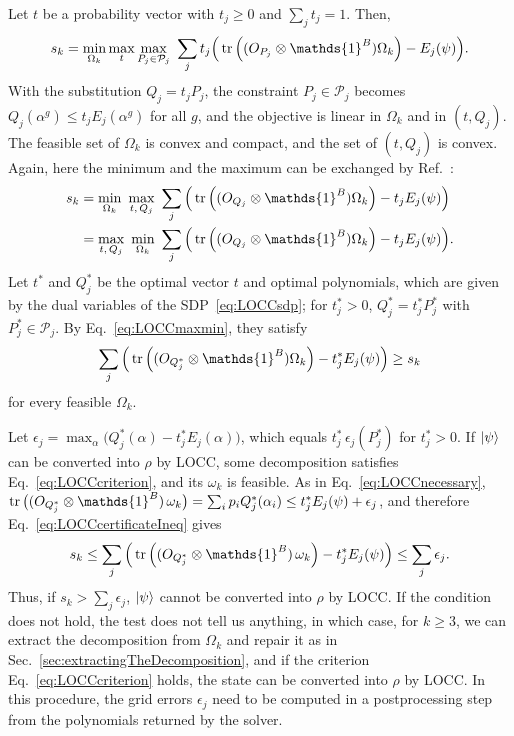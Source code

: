 \documentclass[aps,pra,onecolumn,superscriptaddress]{revtex4-2}
\newcommand{\one}{\mathds{1}}
\newcommand{\I}{\one}
\renewcommand{\a}{\alpha}
\begin{document}
\begin{widetext}
Let $t$ be a probability vector with $t_j \geq 0$ and $\sum_j t_j = 1$. Then,
\begin{align}\label{eq:LOCCminmaxT}
    s_k=\min_{\Omega_k} \max_t \max_{P_j\in\mathcal{P}_j}\ \sum_j t_j\Big(\tr\left((O_{P_j}\otimes\I^B)\Omega_k\right)-E_j(\psi)\Big).
\end{align}
With the substitution $Q_j=t_jP_j$, the constraint $P_j\in\mathcal{P}_j$ becomes $Q_j(\a^g)\leq t_jE_j(\a^g)$ for all $g$, and the objective is linear in $\Omega_k$ and in $(t,Q_j)$. The feasible set of $\Omega_k$ is convex and compact, and the set of $(t,Q_j)$ is convex. Again, here the minimum and the maximum can be exchanged by Ref.~\cite{Sion1958}:
\begin{align}
    s_k&=\min_{\Omega_k}\ \max_{t,\,Q_j}\ \sum_j \Big(\tr\left((O_{Q_j}\otimes\I^B)\Omega_k\right)-t_jE_j(\psi)\Big)\nonumber\\
    &=\max_{t,\,Q_j}\ \min_{\Omega_k}\ \sum_j \Big(\tr\left((O_{Q_j}\otimes\I^B)\Omega_k\right)-t_jE_j(\psi)\Big).\label{eq:LOCCmaxmin}
\end{align}
Let $t^*$ and $Q_j^*$ be the optimal vector $t$ and optimal polynomials, which are given by the dual variables of the SDP~\eqref{eq:LOCCsdp}; for $t^*_j>0$, $Q^*_j=t^*_jP^*_j$ with $P^*_j\in\mathcal{P}_j$.
By Eq.~\eqref{eq:LOCCmaxmin}, they satisfy
\begin{equation}\label{eq:LOCCcertificateIneq}
    \sum_j \Big(\tr\left((O_{Q^*_j}\otimes\I^B)\Omega_k\right)-t^*_jE_j(\psi)\Big)\geq s_k
\end{equation}
for every feasible $\Omega_k$.

Let $\epsilon_j=\max_\a\big(Q^*_j(\a)-t^*_jE_j(\a)\big)$, which equals $t^*_j\,\epsilon_j(P^*_j)$ for $t^*_j>0$. If $\ket{\psi}$ can be converted into $\rho$ by LOCC, some decomposition satisfies Eq.~\eqref{eq:LOCCcriterion}, and its $\omega_k$ is feasible. As in Eq.~\eqref{eq:LOCCnecessary}, $\tr\big((O_{Q^*_j}\otimes\I^B)\,\omega_k\big)=\sum_ip_iQ^*_j(\a_i) \leq t^*_jE_j(\psi)+\epsilon_j$, and therefore Eq.~\eqref{eq:LOCCcertificateIneq} gives
\begin{equation}
    s_k \leq \sum_j \Big(\tr\left((O_{Q^*_j}\otimes\I^B)\,\omega_k \right)-t^*_jE_j(\psi)\Big) \leq \sum_j \epsilon_j.
\end{equation}
Thus, if $s_k > \sum_j \epsilon_j$, $\ket{\psi}$ cannot be converted into $\rho$ by LOCC. If the condition does not hold, the test does not tell us anything, in which case, for $k\geq3$, we can extract the decomposition from $\Omega_k$ and repair it as in Sec.~\ref{sec:extractingTheDecomposition}, and if the criterion Eq.~\eqref{eq:LOCCcriterion} holds, the state can be converted into $\rho$ by LOCC.
In this procedure, the grid errors $\epsilon_j$ need to be computed in a postprocessing step from the polynomials returned by the solver.


\end{widetext}
\end{document}
